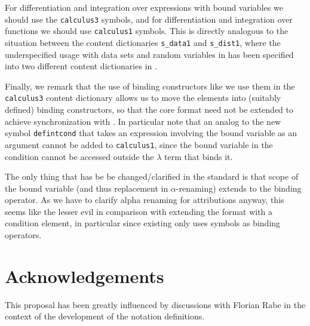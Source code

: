 \documentclass[12pt]{article}
\begin{document}
For differentiation and integration over expressions with bound variables we should use
the {\texttt{calculus3}} symbols, and for differentiation and integration over functions
we should use {\texttt{calculus1}} symbols. This is directly analogous to the situation
between the content dictionaries {\texttt{s\_data1}} and {\texttt{s\_dist1}}, where the
underspecified usage with data sets and random variables in {\mathml} has been specified
into two different content dictionaries in {\openmath}.

Finally, we remark that the use of binding constructors like we use them in the
{\texttt{calculus3}} content dictionary allows us to move the {\mathml}
{} elements into (suitably defined) binding constructors, so that the
core {\openmath} format need not be extended to achieve synchronization with {\mathml}. In
particular note that an analog to the new symbol {\texttt{defintcond}} that takes an
expression involving the bound variable as an argument cannot be added to
{\texttt{calculus1}}, since the bound variable in the condition cannot be accessed outside
the $\lambda$ term that binds it.

The only thing that has be be changed/clarified in the {} standard is that scope
of the bound variable (and thus replacement in $\alpha$-renaming) extends to the binding
operator. As we have to clarify alpha renaming for attributions anyway, this seems like
the lesser evil in comparison with extending the {\openmath} format with a condition
element, in particular since existing {\openmath} only uses symbols as binding operators.

% 


\section{Acknowledgements}
This proposal has been greatly influenced by discussions with Florian Rabe in the context
of the development of the {} notation definitions.

 

\end{document}
